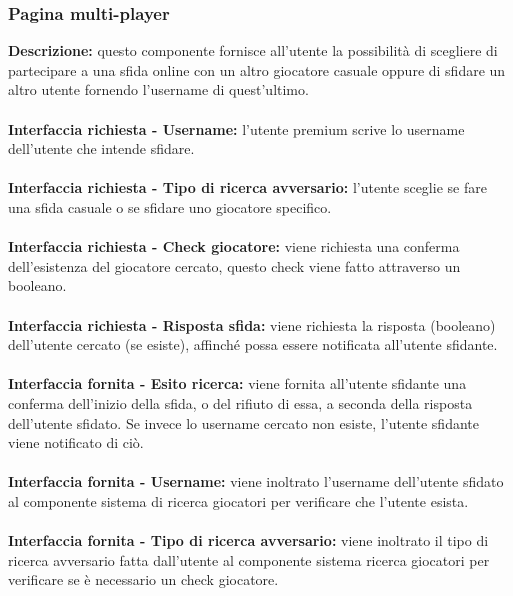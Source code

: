 \subsubsection{Pagina multi-player}
\textbf{Descrizione: }questo componente fornisce all'utente la possibilità di scegliere di partecipare a una sfida online con un altro giocatore casuale oppure di sfidare un altro utente fornendo l'username di quest'ultimo.\\
\\
\textbf{Interfaccia richiesta - Username: }l'utente premium scrive lo username dell'utente che intende sfidare.\\
\\
\textbf{Interfaccia richiesta - Tipo di ricerca avversario: }l'utente sceglie se fare una sfida casuale o se sfidare uno giocatore specifico.\\
\\
\textbf{Interfaccia richiesta - Check giocatore: }viene richiesta una conferma dell'esistenza del giocatore cercato, questo check viene fatto attraverso un booleano.\\
\\
\textbf{Interfaccia richiesta - Risposta sfida: }viene richiesta la risposta (booleano) dell'utente cercato (se esiste), affinché possa essere notificata all'utente sfidante.\\
\\
\textbf{Interfaccia fornita - Esito ricerca: }viene fornita all'utente sfidante una conferma dell'inizio della sfida, o del rifiuto di essa, a seconda della risposta dell'utente sfidato. Se invece lo username cercato non esiste, l'utente sfidante viene notificato di ciò.\\
\\
\textbf{Interfaccia fornita - Username: }viene inoltrato l'username dell'utente sfidato al componente sistema di ricerca giocatori per verificare che l'utente esista.\\
\\
\textbf{Interfaccia fornita - Tipo di ricerca avversario: }viene inoltrato il tipo di ricerca avversario fatta dall'utente al componente sistema ricerca giocatori per verificare se è necessario un check giocatore.\\

